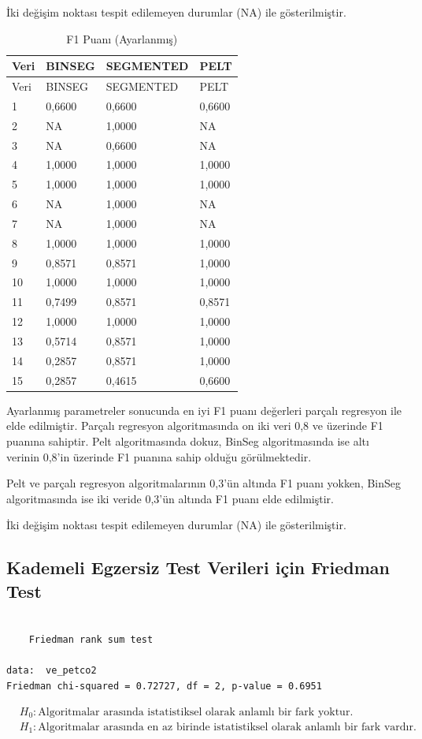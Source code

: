 \documentclass[12pt,twoside]{deuthesis}
\begin{document}
İki değişim noktası tespit edilemeyen durumlar (NA) ile gösterilmiştir.

\begin{longtable}[]{@{}llll@{}}
\caption{\label{tab:nvar7} F1 Puanı (Ayarlanmış)}\tabularnewline
\toprule
Veri & BINSEG & SEGMENTED & PELT\tabularnewline
\midrule
\endfirsthead
\toprule
Veri & BINSEG & SEGMENTED & PELT\tabularnewline
\midrule
\endhead
1 & 0,6600 & 0,6600 & 0,6600\tabularnewline
2 & NA & 1,0000 & NA\tabularnewline
3 & NA & 0,6600 & NA\tabularnewline
4 & 1,0000 & 1,0000 & 1,0000\tabularnewline
5 & 1,0000 & 1,0000 & 1,0000\tabularnewline
6 & NA & 1,0000 & NA\tabularnewline
7 & NA & 1,0000 & NA\tabularnewline
8 & 1,0000 & 1,0000 & 1,0000\tabularnewline
9 & 0,8571 & 0,8571 & 1,0000\tabularnewline
10 & 1,0000 & 1,0000 & 1,0000\tabularnewline
11 & 0,7499 & 0,8571 & 0,8571\tabularnewline
12 & 1,0000 & 1,0000 & 1,0000\tabularnewline
13 & 0,5714 & 0,8571 & 1,0000\tabularnewline
14 & 0,2857 & 0,8571 & 1,0000\tabularnewline
15 & 0,2857 & 0,4615 & 0,6600\tabularnewline
\bottomrule
\end{longtable}

Ayarlanmış parametreler sonucunda en iyi F1 puanı değerleri parçalı regresyon ile elde edilmiştir. Parçalı regresyon algoritmasında on iki veri 0,8 ve üzerinde F1 puanına sahiptir. Pelt algoritmasında dokuz, BinSeg algoritmasında ise altı verinin 0,8'in üzerinde F1 puanına sahip olduğu görülmektedir.

Pelt ve parçalı regresyon algoritmalarının 0,3'ün altında F1 puanı yokken, BinSeg algoritmasında ise iki veride 0,3'ün altında F1 puanı elde edilmiştir.

İki değişim noktası tespit edilemeyen durumlar (NA) ile gösterilmiştir.

\hypertarget{kademeli-egzersiz-test-verileri-iuxe7in-friedman-test}{%
\subsection{Kademeli Egzersiz Test Verileri için Friedman Test}\label{kademeli-egzersiz-test-verileri-iuxe7in-friedman-test}}

\begin{verbatim}

    Friedman rank sum test

data:  ve_petco2
Friedman chi-squared = 0.72727, df = 2, p-value = 0.6951
\end{verbatim}

\begin{align*}
& H_0: \text{Algoritmalar arasında istatistiksel olarak anlamlı bir fark yoktur.} \\
& H_1: \text{Algoritmalar arasında en az birinde istatistiksel olarak anlamlı bir fark vardır.}
\end{align*}
\end{document}
